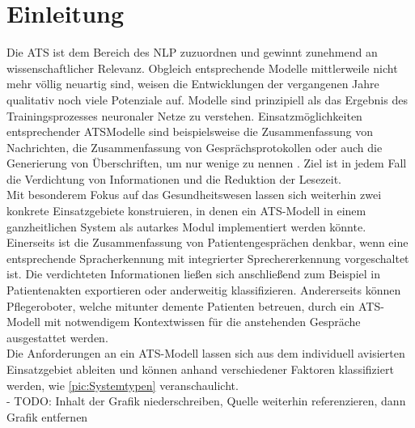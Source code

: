 \chapter{Einleitung}
\thispagestyle{fancy}
\label{chap:Einleitung}

Die \ac{ATS} ist dem Bereich des \ac{NLP} zuzuordnen und gewinnt zunehmend an wissenschaftlicher Relevanz. Obgleich entsprechende Modelle mittlerweile nicht mehr völlig neuartig sind, weisen die Entwicklungen der vergangenen Jahre qualitativ noch viele Potenziale auf. Modelle sind prinzipiell als das Ergebnis des Trainingsprozesses neuronaler Netze zu verstehen. Einsatzmöglichkeiten entsprechender \ac{ATS}Modelle sind beispielsweise die Zusammenfassung von Nachrichten, die Zusammenfassung von Gesprächsprotokollen oder auch die Generierung von Überschriften, um nur wenige zu nennen \cite{GON20, GAM16}. Ziel ist in jedem Fall die Verdichtung von Informationen und die Reduktion der Lesezeit.\\

Mit besonderem Fokus auf das Gesundheitswesen lassen sich weiterhin zwei konkrete Einsatzgebiete konstruieren, in denen ein \ac{ATS}-Modell in einem ganzheitlichen System als autarkes Modul implementiert werden könnte. Einerseits ist die Zusammenfassung von Patientengesprächen denkbar, wenn eine entsprechende Spracherkennung mit integrierter Sprechererkennung vorgeschaltet ist. Die verdichteten Informationen ließen sich anschließend zum Beispiel in Patientenakten exportieren oder anderweitig klassifizieren. Andererseits können Pflegeroboter, welche mitunter demente Patienten betreuen, durch ein \ac{ATS}-Modell mit notwendigem Kontextwissen für die anstehenden Gespräche ausgestattet werden.\\

Die Anforderungen an ein \ac{ATS}-Modell lassen sich aus dem individuell avisierten Einsatzgebiet ableiten und können anhand verschiedener Faktoren klassifiziert werden, wie \autoref{pic:Systemtypen} veranschaulicht.\\
- TODO: Inhalt der Grafik niederschreiben, Quelle weiterhin referenzieren, dann Grafik entfernen

